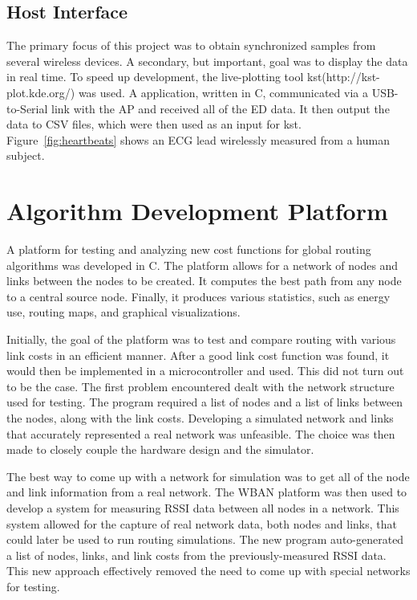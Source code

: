 \documentclass{article}
\begin{document}
\subsection{Host Interface}
The primary focus of this project was to obtain synchronized samples from several wireless devices. A secondary, but important, goal was to display the data in real time. To speed up development, the live-plotting tool kst(http://kst-plot.kde.org/) was used. A application, written in C, communicated via a USB-to-Serial link with the AP and received all of the ED data. It then output the data to CSV files, which were then used as an input for kst. Figure~\ref{fig:heartbeats} shows an ECG lead wirelessly measured from a human subject.



\section{Algorithm Development Platform}
A platform for testing and analyzing new cost functions for global routing algorithms was developed in C. The platform allows for a network of nodes and links between the nodes to be created. It computes the best path from any node to a central source node. Finally, it produces various statistics, such as energy use, routing maps, and graphical visualizations.

Initially, the goal of the platform was to test and compare routing with various link costs in an efficient manner. After a good link cost function was found, it would then be implemented in a microcontroller and used. This did not turn out to be the case. The first problem encountered dealt with the network structure used for testing. The program required a list of nodes and a list of links between the nodes, along with the link costs. Developing a simulated network and links that accurately represented a real network was unfeasible. The choice was then made to closely couple the hardware design and the simulator.

The best way to come up with a network for simulation was to get all of the node and link information from a real network. The WBAN platform was then used to develop a system for measuring RSSI data between all nodes in a network. This system allowed for the capture of real network data, both nodes and links, that could later be used to run routing simulations. The new program auto-generated a list of nodes, links, and link costs from the previously-measured RSSI data. This new approach effectively removed the need to come up with special networks for testing. 
\end{document}
